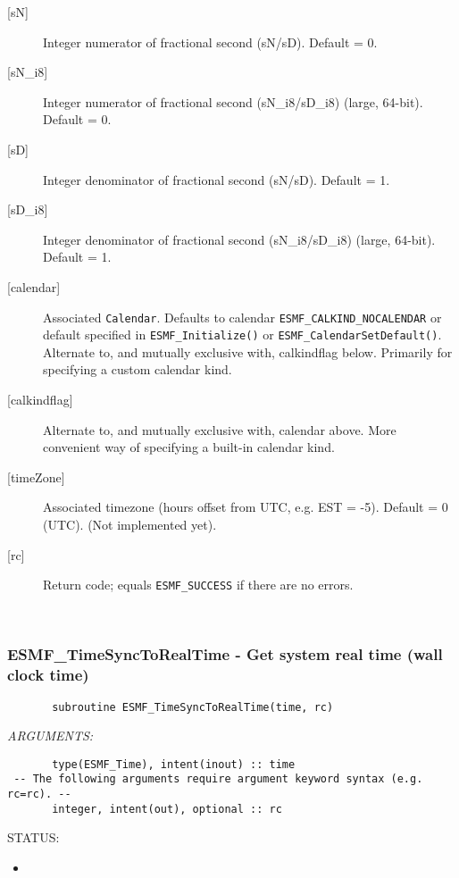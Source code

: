 \begin{description}
       \item[{[sN]}]
            Integer numerator of fractional second (sN/sD).
            Default = 0.
       \item[{[sN\_i8]}]
            Integer numerator of fractional second (sN\_i8/sD\_i8)
                                                             (large, 64-bit).
            Default = 0.
       \item[{[sD]}]
            Integer denominator of fractional second (sN/sD).
            Default = 1.
       \item[{[sD\_i8]}]
            Integer denominator of fractional second (sN\_i8/sD\_i8)
                                                             (large, 64-bit).
            Default = 1.
       \item[{[calendar]}]
            \begin{sloppypar}
            Associated {\tt Calendar}.  Defaults to calendar
            {\tt ESMF\_CALKIND\_NOCALENDAR} or default specified in
            {\tt ESMF\_Initialize()} or {\tt ESMF\_CalendarSetDefault()}.
            Alternate to, and mutually exclusive with, calkindflag
            below.  Primarily for specifying a custom calendar kind.
            \end{sloppypar}
       \item[{[calkindflag]}]
            Alternate to, and mutually exclusive with, calendar above.  More
            convenient way of specifying a built-in calendar kind.
       \item[{[timeZone]}]
            Associated timezone (hours offset from UTC, e.g. EST = -5).
            Default = 0 (UTC).  (Not implemented yet).
       \item[{[rc]}]
            Return code; equals {\tt ESMF\_SUCCESS} if there are no errors.
       \end{description}
   
 
\mbox{}\hrulefill\ 
 
\subsubsection [ESMF\_TimeSyncToRealTime] {ESMF\_TimeSyncToRealTime - Get system real time (wall clock time)}


  
\begin{verbatim}       subroutine ESMF_TimeSyncToRealTime(time, rc)\end{verbatim}{\em ARGUMENTS:}
\begin{verbatim}       type(ESMF_Time), intent(inout) :: time
 -- The following arguments require argument keyword syntax (e.g. rc=rc). --
       integer, intent(out), optional :: rc\end{verbatim}
{\sf STATUS:}
   \begin{itemize}
   \item{}
   \end{itemize}
  
